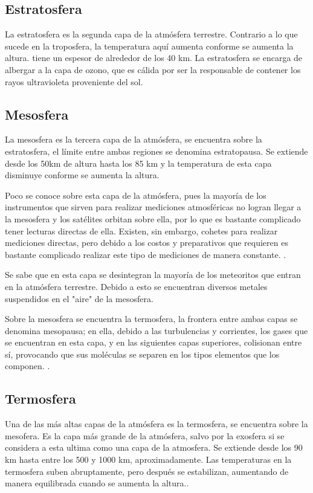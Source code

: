 \documentclass[12pt]{article}
\begin{document}
\subsection{Estratosfera}
La estratosfera es la segunda capa de la atmósfera terrestre. Contrario a lo que sucede en la troposfera, la temperatura aquí aumenta conforme se aumenta la altura. tiene un espesor de alrededor de los 40 km. 
    La estratosfera se encarga de albergar a la capa de ozono, que es cálida por ser la responsable de contener los rayos ultravioleta proveniente del sol.\cite{ncsu}
    
\subsection{Mesosfera}
La mesosfera es la tercera capa de la atmósfera, se encuentra sobre la estratosfera, el límite entre ambas regiones se denomina estratopausa. Se extiende desde los 50km de altura hasta los 85 km y la temperatura de esta capa disminuye conforme se aumenta la altura.

    Poco se conoce sobre esta capa de la atmósfera, pues la mayoría de los instrumentos que sirven para realizar mediciones atmosféricas no logran llegar a la mesosfera y los satélites orbitan sobre ella, por lo que es bastante complicado tener lecturas directas de ella. Existen, sin embargo, cohetes para realizar mediciones directas, pero debido a los costos y preparativos que requieren es bastante complicado realizar este tipo de mediciones de manera constante. \cite{ucar}.
    
    Se sabe que en esta capa se desintegran la mayoría de los meteoritos que entran en la atmósfera terrestre. Debido a esto se encuentran diversos metales suspendidos en el "aire" de la mesosfera. 
    
    Sobre la mesosfera se encuentra la termosfera, la frontera entre ambas capas se denomina mesopausa; en ella, debido a las turbulencias y corrientes, los gases que se encuentran en esta capa, y en las siguientes capas superiores, colisionan entre sí, provocando que sus moléculas se separen en los tipos elementos que los componen. \cite{ucar}.

\subsection{Termosfera}
Una de las más altas capas de la atmósfera es la termosfera, se encuentra sobre la mesofera. Es la capa más grande de la atmósfera, salvo por la exosfera si se considera a esta ultima como una capa de la atmosfera. 
    Se extiende desde los 90 km hasta entre los 500 y 1000 km, aproximadamente. Las temperaturas en la termosfera suben abruptamente, pero después se estabilizan, aumentando de manera equilibrada cuando se aumenta la altura.\cite{termo}.
    
\end{document}

